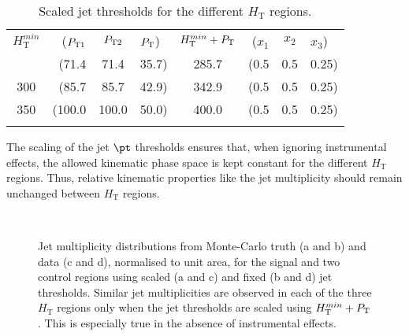 \medskip
\begin{table}[!h]
 \begin{center}
   \caption{\label{tab:thresholds} Scaled \pt jet thresholds for the
     different $H_{\mathrm{T}}$ regions.}
  \begin{tabular}{cr@{,}c@{,}lcr@{,}c@{,}l}
   \hline\noalign{\smallskip}
   $H_{\mathrm{T}}^{min}$ & 
   ($P_{\mathrm{T1}}$&$P_{\mathrm{T2}}$&$P_{\mathrm{T}}$) & 
   $H_{\mathrm{T}}^{min} + P_{\mathrm{T}}$ &
   ($x_1$&$x_2$&$x_3$) \\
   \noalign{\smallskip}\hline
   250 & (71.4&71.4&35.7) & 285.7 & (0.5&0.5&0.25) \\
   300 & (85.7&85.7&42.9) & 342.9 & (0.5&0.5&0.25) \\
   350 & (100.0&100.0&50.0) & 400.0 & (0.5&0.5&0.25) \\
   \noalign{\smallskip}\hline
  \end{tabular}
 \end{center}
\end{table}

The scaling of the jet $\pt$ thresholds ensures that, when ignoring
instrumental effects, the allowed kinematic phase space is kept
constant for the different $H_{\mathrm{T}}$ regions. Thus, relative
kinematic properties like the jet multiplicity should remain unchanged
between $H_{\mathrm{T}}$ regions.

\begin{figure}[!t]
  \begin{center} 
     \\
    \caption{\label{fig:jet_multiplicity} Jet multiplicity
      distributions from Monte-Carlo truth (a and b) and data (c and
      d), normalised to unit area, for the signal and two control
      regions using scaled (a and c) and fixed (b and d) jet \pt
      thresholds. Similar jet multiplicities are observed in each of
      the three $H_{\mathrm{T}}$ regions only when the jet \pt
      thresholds are scaled using $H_{\mathrm{T}}^{min} +
      P_{\mathrm{T}}$. This is especially true in the absence of instrumental
      effects.}
  \end{center}
\end{figure}

